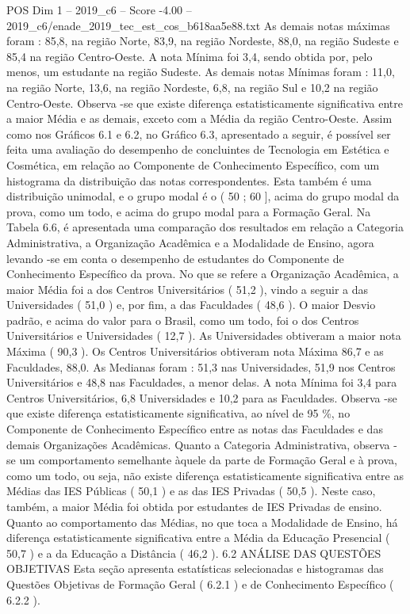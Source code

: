 \begin{textsample}{POS Dim 1 – 2019\_c6 – Score -4.00 – 2019\_c6/enade\_2019\_tec\_est\_cos\_b618aa5e88.txt}
As demais notas máximas foram : 85,8, na região Norte, 83,9, na região Nordeste, 88,0, na região Sudeste e 85,4 na região Centro-Oeste.
A nota Mínima foi 3,4, sendo obtida por, pelo menos, um estudante na região Sudeste.
As demais notas Mínimas foram : 11,0, na região Norte, 13,6, na região Nordeste, 6,8, na região Sul e 10,2 na região Centro-Oeste.
Observa -se que existe diferença estatisticamente significativa entre a maior Média e as demais, exceto com a Média da região Centro-Oeste.
Assim como nos Gráficos 6.1 e 6.2, no Gráfico 6.3, apresentado a seguir, é possível ser feita uma avaliação do desempenho de concluintes de Tecnologia em Estética e Cosmética, em relação ao Componente de Conhecimento Específico, com um histograma da distribuição das notas correspondentes.
Esta também é uma distribuição unimodal, e o grupo modal é o ( 50 ; 60 ], acima do grupo modal da prova, como um todo, e acima do grupo modal para a Formação Geral.
Na Tabela 6.6, é apresentada uma comparação dos resultados em relação a Categoria Administrativa, a Organização Acadêmica e a Modalidade de Ensino, agora levando -se em conta o desempenho de estudantes do Componente de Conhecimento Específico da prova.
No que se refere a Organização Acadêmica, a maior Média foi a dos Centros Universitários ( 51,2 ), vindo a seguir a das Universidades ( 51,0 ) e, por fim, a das Faculdades ( 48,6 ).
O maior Desvio padrão, e acima do valor para o Brasil, como um todo, foi o dos Centros Universitários e Universidades ( 12,7 ).
As Universidades obtiveram a maior nota Máxima ( 90,3 ).
Os Centros Universitários obtiveram nota Máxima 86,7 e as Faculdades, 88,0.
As Medianas foram : 51,3 nas Universidades, 51,9 nos Centros Universitários e 48,8 nas Faculdades, a menor delas.
A nota Mínima foi 3,4 para Centros Universitários, 6,8 Universidades e 10,2 para as Faculdades.
Observa -se que existe diferença estatisticamente significativa, ao nível de 95 \%, no Componente de Conhecimento Específico entre as notas das Faculdades e das demais Organizações Acadêmicas.
Quanto a Categoria Administrativa, observa -se um comportamento semelhante àquele da parte de Formação Geral e à prova, como um todo, ou seja, não existe diferença estatisticamente significativa entre as Médias das IES Públicas ( 50,1 ) e as das IES Privadas ( 50,5 ).
Neste caso, também, a maior Média foi obtida por estudantes de IES Privadas de ensino.
Quanto ao comportamento das Médias, no que toca a Modalidade de Ensino, há diferença estatisticamente significativa entre a Média da Educação Presencial ( 50,7 ) e a da Educação a Distância ( 46,2 ). 6.2 ANÁLISE DAS QUESTÕES OBJETIVAS Esta seção apresenta estatísticas selecionadas e histogramas das Questões Objetivas de Formação Geral ( 6.2.1 ) e de Conhecimento Específico ( 6.2.2 ).

\end{textsample}
